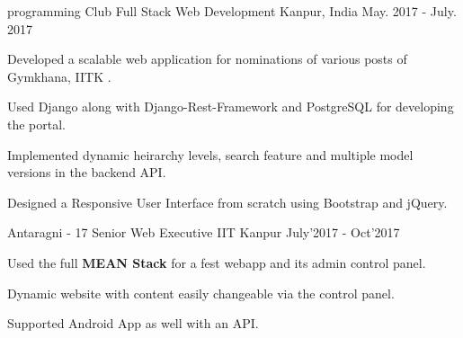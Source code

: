 


\begin{cventries}


 \cventry
    {programming Club}
    {Full Stack Web Development}
    {Kanpur, India}
    {May. 2017 - July. 2017}
    {
      \begin{cvitems}
          \item Developed a scalable web application for nominations of various posts of Gymkhana, IITK .
  \item Used Django along with Django-Rest-Framework and PostgreSQL for developing the portal.  
  \item	Implemented dynamic heirarchy levels, search feature and multiple model versions in the backend API.
  \item Designed a Responsive User Interface from scratch using Bootstrap and jQuery.
      \end{cvitems}
    }
    
  \cventry
  {Antaragni - 17}
  {Senior Web Executive}
  {IIT Kanpur}
  {July'2017 - Oct'2017}
  {
    \begin{cvitems}
    \item Used the full \textbf{MEAN Stack} for a fest webapp and its admin control panel.
    \item Dynamic website with content easily changeable via the control panel.
    \item Supported Android App as well with an API.
    \end{cvitems}
  }
  


\end{cventries}

